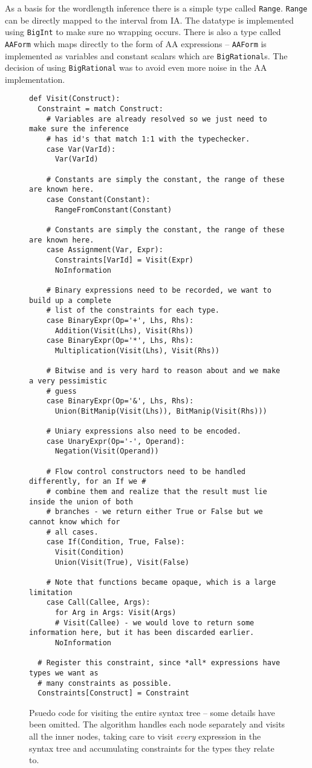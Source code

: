 As a basis for the wordlength inference there is a simple type called \verb+Range+. \verb+Range+ can be directly mapped to the interval from IA. The datatype is implemented using \verb+BigInt+ to make sure no wrapping occurs. There is also a type called \verb+AAForm+ which maps directly to the form of AA expressions -- \verb+AAForm+ is implemented as variables and constant scalars which are \verb+BigRational+s. The decision of using \verb+BigRational+ was to avoid even more noise in the AA implementation.

\begin{figure}
\begin{verbatim}
def Visit(Construct):
  Constraint = match Construct:
    # Variables are already resolved so we just need to make sure the inference
    # has id's that match 1:1 with the typechecker.
    case Var(VarId):
      Var(VarId)

    # Constants are simply the constant, the range of these are known here.
    case Constant(Constant):
      RangeFromConstant(Constant)

    # Constants are simply the constant, the range of these are known here.
    case Assignment(Var, Expr):
      Constraints[VarId] = Visit(Expr)
      NoInformation

    # Binary expressions need to be recorded, we want to build up a complete
    # list of the constraints for each type.
    case BinaryExpr(Op='+', Lhs, Rhs):
      Addition(Visit(Lhs), Visit(Rhs))
    case BinaryExpr(Op='*', Lhs, Rhs):
      Multiplication(Visit(Lhs), Visit(Rhs))

    # Bitwise and is very hard to reason about and we make a very pessimistic
    # guess
    case BinaryExpr(Op='&', Lhs, Rhs):
      Union(BitManip(Visit(Lhs)), BitManip(Visit(Rhs)))

    # Uniary expressions also need to be encoded.
    case UnaryExpr(Op='-', Operand):
      Negation(Visit(Operand))

    # Flow control constructors need to be handled differently, for an If we #
    # combine them and realize that the result must lie inside the union of both
    # branches - we return either True or False but we cannot know which for
    # all cases.
    case If(Condition, True, False):
      Visit(Condition)
      Union(Visit(True), Visit(False)

    # Note that functions became opaque, which is a large limitation
    case Call(Callee, Args):
      for Arg in Args: Visit(Args)
      # Visit(Callee) - we would love to return some information here, but it has been discarded earlier.
      NoInformation

  # Register this constraint, since *all* expressions have types we want as
  # many constraints as possible.
  Constraints[Construct] = Constraint
\end{verbatim}
  \caption{Psuedo code for visiting the entire syntax tree -- some details have been omitted. The algorithm handles each node separately and visits all the inner nodes, taking care to visit \textit{every} expression in the syntax tree and accumulating constraints for the types they relate to.}
\label{fig:AstWalker}
\end{figure}


